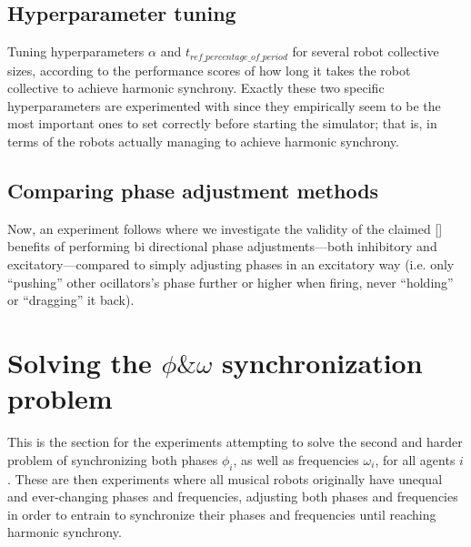 	
	\subsection{Hyperparameter tuning}
	Tuning hyperparameters $\alpha$ and $t_{ref\_percentage\_of\_period}$ for several robot collective sizes, according to the performance scores of how long it takes the robot collective to achieve harmonic synchrony. Exactly these two specific hyperparameters are experimented with since they empirically seem to be the most important ones to set correctly before starting the simulator; that is, in terms of the robots actually managing to achieve harmonic synchrony.
	
	
	\subsection{Comparing phase adjustment methods}
	Now, an experiment follows where we investigate the validity of the claimed [] benefits of performing bi directional phase adjustments—both inhibitory and excitatory—compared to simply adjusting phases in an excitatory way (i.e. only ``pushing'' other ocillators's phase further or higher when firing, never ``holding'' or ``dragging'' it back).
	
	
	
	
\section{Solving the $\phi \& \omega$ synchronization problem}
This is the section for the experiments attempting to solve the second and harder problem of synchronizing both phases $\phi_i$, as well as frequencies $\omega_i$, for all agents $i$. These are then experiments where all musical robots originally have unequal and ever-changing phases  and frequencies, adjusting both phases and frequencies in order to entrain to synchronize their phases and frequencies until reaching harmonic synchrony.

